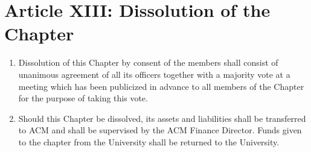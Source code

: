\section*{Article XIII: Dissolution of the Chapter}

\begin{enumerate}
    \item Dissolution of this Chapter by consent of the members shall consist of unanimous agreement of all its officers together with a majority vote at a meeting which has been publicized in advance to all members of the Chapter for the purpose of taking this vote.
    \item Should this Chapter be dissolved, its assets and liabilities shall be transferred to ACM and shall be supervised by the ACM Finance Director.
    Funds given to the chapter from the University shall be returned to the University.
\end{enumerate}
